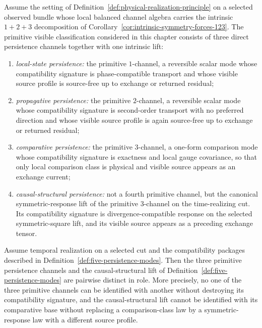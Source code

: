 \begin{definition}
\label{def:five-persistence-modes}
Assume the setting of Definition~\ref{def:physical-realization-principle} on a
selected observed bundle whose local balanced channel algebra carries the
intrinsic \(1+2+3\) decomposition of
Corollary~\ref{cor:intrinsic-symmetry-forces-123}. The primitive visible
classification considered in this chapter consists of three direct persistence
channels together with one intrinsic lift:
\begin{enumerate}[label=(\roman*), leftmargin=2em, itemsep=0.2em]
\item \emph{local-state persistence:} the primitive \(1\)-channel, a
      reversible scalar mode whose
      compatibility signature is phase-compatible transport and whose visible
      source profile is source-free up to exchange or returned residual;
\item \emph{propagative persistence:} the primitive \(2\)-channel, a
      reversible scalar mode whose
      compatibility signature is second-order transport with no preferred
      direction and whose visible source profile is again source-free up to
      exchange or returned residual;
\item \emph{comparative persistence:} the primitive \(3\)-channel, a
      one-form comparison mode whose
      compatibility signature is exactness and local gauge covariance, so that
      only local comparison class is physical and visible source appears as an
      exchange current;
\item \emph{causal-structural persistence:} not a fourth primitive channel,
      but the canonical symmetric-response lift of the primitive \(3\)-channel
      on the time-realizing cut. Its compatibility signature is
      divergence-compatible response on the selected symmetric-square lift, and
      its visible source appears as a preceding exchange tensor.
\end{enumerate}
\end{definition}

\begin{theorem}
\label{thm:persistence-mode-separation}
Assume temporal realization on a selected cut and the compatibility packages
described in Definition~\ref{def:five-persistence-modes}. Then the three
primitive persistence channels and the causal-structural lift of
Definition~\ref{def:five-persistence-modes} are pairwise distinct in role.
More precisely, no one of the three primitive channels can be identified with
another without destroying its compatibility signature, and the
causal-structural lift cannot be identified with its comparative base without
replacing a comparison-class law by a symmetric-response law with a different
source profile.
\end{theorem}

